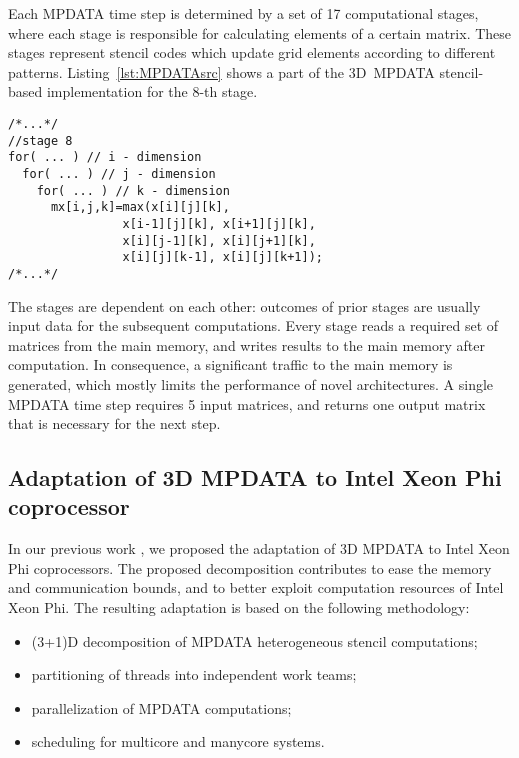 \documentclass{acm_proc_article-sp}
\begin{document}
Each MPDATA time step is determined by a set of 17 computational stages, where each stage is responsible for calculating elements of a certain matrix.
These stages represent stencil codes which update grid elements according to different patterns. Listing~\ref{lst:MPDATAsrc} shows a part of the 3D~MPDATA stencil-based implementation for the 8-th stage.

\begin{lstlisting}[caption={Part of 3D MPDATA stencil-based implementation}, label={lst:MPDATAsrc}]
/*...*/
//stage 8
for( ... ) // i - dimension
  for( ... ) // j - dimension
    for( ... ) // k - dimension
      mx[i,j,k]=max(x[i][j][k],
                x[i-1][j][k], x[i+1][j][k],
                x[i][j-1][k], x[i][j+1][k],
                x[i][j][k-1], x[i][j][k+1]);
/*...*/
\end{lstlisting}

The stages are dependent on each other: outcomes of prior stages are usually input data for the subsequent computations.
Every stage reads a required set of matrices from the main memory, and writes results to the main memory after computation.
In consequence, a significant traffic to the main memory is generated, which mostly limits the performance of novel architectures.
A single MPDATA time step requires 5 input matrices, and returns one output matrix that is necessary for the next step.

\subsection{Adaptation of 3D MPDATA to Intel Xeon Phi coprocessor}
\label{subsec:adaptation}

In our previous work \cite{SZU13,SZU15}, we proposed the adaptation of 3D MPDATA to Intel Xeon Phi coprocessors.
The proposed decomposition contributes to ease the memory and communication bounds, and to better exploit computation resources of Intel Xeon Phi.
The resulting adaptation is based on the following methodology:
\begin{itemize}
\item (3+1)D decomposition of MPDATA heterogeneous stencil computations;
\item partitioning of threads into independent work teams;
\item parallelization of MPDATA computations;
\item scheduling for multicore and manycore systems.
\end{itemize}
\end{document}
